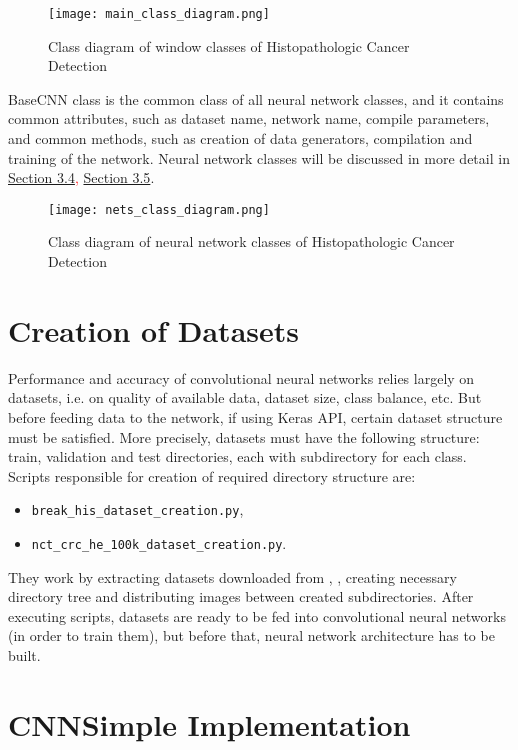 \begin{figure}[h]
	\centering
	\texttt{[image: main\_class\_diagram.png]}
	\caption{Class diagram of window classes of Histopathologic Cancer Detection}
	\label{fig:class2}
\end{figure}

\clearpage

BaseCNN class is the common class of all neural network classes, and it contains common attributes, such as dataset name, network name, compile parameters, and common methods, such as creation of data generators, compilation and training of the network. Neural network classes will be discussed in more detail in \textcolor{red}{\hyperref[cnn]{Section 3.4}, \hyperref[vgg19]{Section 3.5}}.

\begin{figure}[h]
	\centering
	\texttt{[image: nets\_class\_diagram.png]}
	\caption{Class diagram of neural network classes of Histopathologic Cancer Detection}
	\label{fig:class1}
\end{figure}

\section{Creation of Datasets}

Performance and accuracy of convolutional neural networks relies largely on datasets, i.e. on quality of available data, dataset size, class balance, etc. But before feeding data to the network, if using Keras API, certain dataset structure must be satisfied. More precisely, datasets must have the following structure: train, validation and test directories, each with subdirectory for each class. Scripts responsible for creation of required directory structure are:
\begin{itemize}
	\itemsep 0em
	\item \texttt{break\_his\_dataset\_creation.py},
	\item \texttt{nct\_crc\_he\_100k\_dataset\_creation.py}.
\end{itemize} 
They work by extracting datasets downloaded from \cite{breakhis_bib}, \cite{nctcrche100k_bib}, creating necessary directory tree and distributing images between created subdirectories. After executing scripts, datasets are ready to be fed into convolutional neural networks (in order to train them), but before that, neural network architecture has to be built.
\clearpage

\section{CNNSimple Implementation}
\label{cnn}

